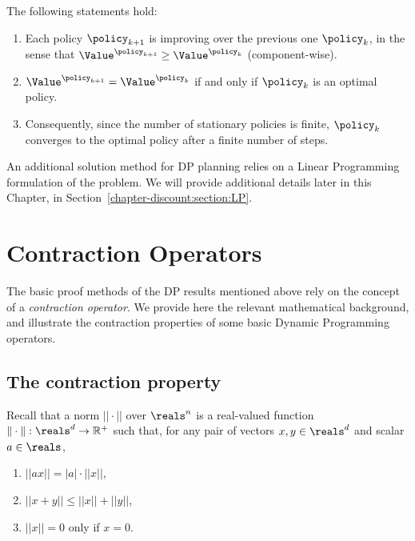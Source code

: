 \begin{theorem}\label{thm:_PI}
The following statements hold:
\begin{enumerate}
  \item Each policy ${\policy _{k + 1}}$ is improving over the previous one ${\policy _k}$, in the sense that ${\Value^{{\policy _{k + 1}}}} \ge {\Value^{{\policy _k}}}$ (component-wise).
  \item ${\Value^{{\policy _{k + 1}}}} = {\Value^{{\policy _k}}}$ if and only if ${\policy _k}$ is an optimal policy.
  \item Consequently, since the number of stationary policies is finite, ${\policy _k}$ converges to the optimal policy after a finite number of steps.
\end{enumerate}
\end{theorem}

An additional solution method for DP planning relies on a Linear
Programming formulation of the problem.
We will provide additional details later in this
Chapter, in Section~\ref{chapter-discount:section:LP}.

\section{Contraction Operators}

The basic proof methods of the DP results mentioned above rely on
the concept of a \emph{contraction operator}. We provide here the
relevant mathematical background, and illustrate the contraction
properties of some basic Dynamic Programming operators.

\subsection{The contraction property}
Recall that a norm $|| \cdot ||$ over $\reals^n$  is a real-valued
function $\|\cdot\| : \reals^d \to \mathbb R^+$ such that, for any
pair of vectors $x,y \in \reals^d$  and scalar $a\in\reals$,
\begin{enumerate}
  \item $||ax|| = |a| \cdot ||x||$,
  \item $||x + y|| \le ||x|| + ||y||$,
  \item $||x|| = 0$ only if $x = 0$.
\end{enumerate}

